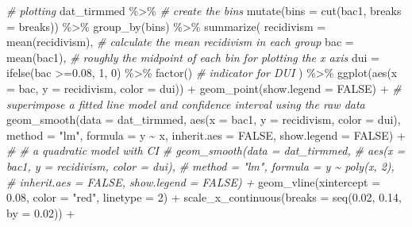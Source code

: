 \documentclass[
  11pt,
]{article}
\newenvironment{Shaded}{\begin{snugshade}}{\end{snugshade}}
\newcommand{\AttributeTok}[1]{\textcolor[rgb]{0.77,0.63,0.00}{#1}}
\newcommand{\CommentTok}[1]{\textcolor[rgb]{0.56,0.35,0.01}{\textit{#1}}}
\newcommand{\ConstantTok}[1]{\textcolor[rgb]{0.00,0.00,0.00}{#1}}
\newcommand{\DecValTok}[1]{\textcolor[rgb]{0.00,0.00,0.81}{#1}}
\newcommand{\FloatTok}[1]{\textcolor[rgb]{0.00,0.00,0.81}{#1}}
\newcommand{\FunctionTok}[1]{\textcolor[rgb]{0.00,0.00,0.00}{#1}}
\newcommand{\NormalTok}[1]{#1}
\newcommand{\SpecialCharTok}[1]{\textcolor[rgb]{0.00,0.00,0.00}{#1}}
\newcommand{\StringTok}[1]{\textcolor[rgb]{0.31,0.60,0.02}{#1}}
\begin{document}
\begin{Shaded}
\begin{Highlighting}[]
\CommentTok{\# plotting}
\NormalTok{dat\_tirmmed }\SpecialCharTok{\%\textgreater{}\%}
  \CommentTok{\# create the bins}
  \FunctionTok{mutate}\NormalTok{(}\AttributeTok{bins =} \FunctionTok{cut}\NormalTok{(bac1, }\AttributeTok{breaks =}\NormalTok{ breaks)) }\SpecialCharTok{\%\textgreater{}\%}
  \FunctionTok{group\_by}\NormalTok{(bins) }\SpecialCharTok{\%\textgreater{}\%}
  \FunctionTok{summarize}\NormalTok{(}
    \AttributeTok{recidivism =} \FunctionTok{mean}\NormalTok{(recidivism), }\CommentTok{\# calculate the mean recidivism in each group}
    \AttributeTok{bac =} \FunctionTok{mean}\NormalTok{(bac1), }\CommentTok{\# roughly the midpoint of each bin for plotting the x axis}
    \AttributeTok{dui =} \FunctionTok{ifelse}\NormalTok{(bac }\SpecialCharTok{\textgreater{}=}\FloatTok{0.08}\NormalTok{, }\DecValTok{1}\NormalTok{, }\DecValTok{0}\NormalTok{) }\SpecialCharTok{\%\textgreater{}\%} \FunctionTok{factor}\NormalTok{() }\CommentTok{\# indicator for DUI}
\NormalTok{  ) }\SpecialCharTok{\%\textgreater{}\%}
  \FunctionTok{ggplot}\NormalTok{(}\FunctionTok{aes}\NormalTok{(}\AttributeTok{x =}\NormalTok{ bac, }\AttributeTok{y =}\NormalTok{ recidivism, }\AttributeTok{color =}\NormalTok{ dui)) }\SpecialCharTok{+}
  \FunctionTok{geom\_point}\NormalTok{(}\AttributeTok{show.legend =} \ConstantTok{FALSE}\NormalTok{) }\SpecialCharTok{+}
  \CommentTok{\# superimpose a fitted line model and confidence interval using the raw data}
  \FunctionTok{geom\_smooth}\NormalTok{(}\AttributeTok{data =}\NormalTok{ dat\_tirmmed,}
              \FunctionTok{aes}\NormalTok{(}\AttributeTok{x =}\NormalTok{ bac1, }\AttributeTok{y =}\NormalTok{ recidivism, }\AttributeTok{color =}\NormalTok{ dui),}
              \AttributeTok{method =} \StringTok{"lm"}\NormalTok{, }\AttributeTok{formula =}\NormalTok{ y }\SpecialCharTok{\textasciitilde{}}\NormalTok{ x,}
              \AttributeTok{inherit.aes =} \ConstantTok{FALSE}\NormalTok{, }\AttributeTok{show.legend =} \ConstantTok{FALSE}\NormalTok{) }\SpecialCharTok{+}
  \CommentTok{\# \# a quadratic model with CI}
  \CommentTok{\# geom\_smooth(data = dat\_tirmmed,}
  \CommentTok{\#             aes(x = bac1, y = recidivism, color = dui),}
  \CommentTok{\#             method = "lm", formula = y \textasciitilde{} poly(x, 2),}
  \CommentTok{\#             inherit.aes = FALSE, show.legend = FALSE) +}
  \FunctionTok{geom\_vline}\NormalTok{(}\AttributeTok{xintercept =} \FloatTok{0.08}\NormalTok{, }\AttributeTok{color =} \StringTok{"red"}\NormalTok{, }\AttributeTok{linetype =} \DecValTok{2}\NormalTok{) }\SpecialCharTok{+}
  \FunctionTok{scale\_x\_continuous}\NormalTok{(}\AttributeTok{breaks =} \FunctionTok{seq}\NormalTok{(}\FloatTok{0.02}\NormalTok{, }\FloatTok{0.14}\NormalTok{, }\AttributeTok{by =} \FloatTok{0.02}\NormalTok{)) }\SpecialCharTok{+}

\end{Highlighting}
\end{Shaded}
\end{document}
